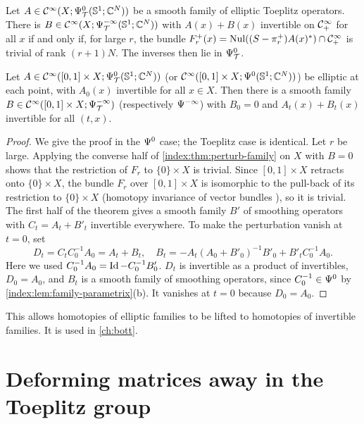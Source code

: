 \begin{corollary}\label{index:cor:toeplitz-perturb}
  Let $A\in\mathcal{C}^\infty(X;\Psi^{0}_{\mathcal T}(\mathbb{S}^1;\mathbb{C}^N))$ be a smooth family of elliptic
  Toeplitz operators. There is $B\in\mathcal{C}^\infty(X;\Psi^{-\infty}_{\mathcal T}(\mathbb{S}^1;\mathbb{C}^N))$
  with $A(x)+B(x)$ invertible on $\mathcal{C}^\infty_{+}$ for all $x$ if and only if, for
  large $r$, the bundle $F^+_r(x)=\operatorname{Nul}((S-\pi^+_r)A(x)^*)\cap\mathcal{C}^\infty_{+}$ is
  trivial of rank $(r+1)N$. The inverses then lie in $\Psi^{0}_{\mathcal T}$.
\end{corollary}

\begin{corollary}\label{index:cor:lift-homotopy}
  Let $A\in\mathcal{C}^\infty([0,1]\times X;\Psi^{0}_{\mathcal T}(\mathbb{S}^1;\mathbb{C}^N))$ (or
  $\mathcal{C}^\infty([0,1]\times X;\Psi^{0}(\mathbb{S}^1;\mathbb{C}^N))$) be elliptic at each point, with
  $A_0(x)$ invertible for all $x\in X$. Then there is a smooth family
  $B\in\mathcal{C}^\infty([0,1]\times X;\Psi^{-\infty}_{\mathcal T})$ (respectively $\Psi^{-\infty}$) with
  $B_0=0$ and $A_t(x)+B_t(x)$ invertible for all $(t,x)$.
\end{corollary}
\begin{proof}
  We give the proof in the $\Psi^{0}$ case; the Toeplitz case is identical. Let
  $r$ be large. Applying the converse half of
  \cref{index:thm:perturb-family} on $X$ with $B=0$ shows that the
  restriction of $F_r$ to $\{0\}\times X$ is trivial. Since $[0,1]\times X$
  retracts onto $\{0\}\times X$, the bundle $F_r$ over $[0,1]\times X$ is
  isomorphic to the pull-back of its restriction to $\{0\}\times X$ (homotopy
  invariance of vector bundles \cite{Atiyah-K}), so it is trivial. The first
  half of the theorem gives a smooth family $B'$ of smoothing operators with
  $C_t=A_t+B'_t$ invertible everywhere. To make the perturbation vanish at
  $t=0$, set
  \begin{equation*}
    D_t=C_tC_0^{-1}A_0=A_t+B_t,\quad
    B_t=-A_t(A_0+B'_0)^{-1}B'_0+B'_tC_0^{-1}A_0.
  \end{equation*}
  Here we used $C_0^{-1}A_0=\operatorname{Id}-C_0^{-1}B'_0$. $D_t$ is invertible as a product
  of invertibles, $D_0=A_0$, and $B_t$ is a smooth family of smoothing
  operators, since $C_0^{-1}\in\Psi^{0}$ by
  \cref{index:lem:family-parametrix}(b). It vanishes at $t=0$ because
  $D_0=A_0$.
\end{proof}

This allows homotopies of elliptic families to be lifted to homotopies of
invertible families. It is used in \cref{ch:bott}.

\section{Deforming matrices away in the Toeplitz group}\label{index:sec:deform}

